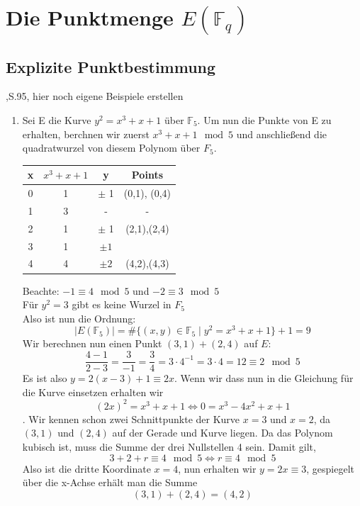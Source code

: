 \section{Die Punktmenge $E(\mathbb{F}_q)$}

\subsection{Explizite Punktbestimmung}
    \cite{washington08},S.95, hier noch eigene Beispiele erstellen
    \begin{enumerate}
        \item Sei E die Kurve $y^2=x^3+x+1$ über $\mathbb{F}_5$. Um nun die Punkte von E zu erhalten, berchnen wir zuerst $x^3+x+1\mod 5$ und anschließend die quadratwurzel von diesem Polynom über $F_5$.
        \begin{center}
            \begin{tabular}{c|c|c|c}
                 x & $x^3+x+1$ & y & Points \\
                 \hline
                 0 & 1 & $\pm$ 1 & (0,1), (0,4) \\
                 1 & 3 & - & - \\
                 2 & 1 & $\pm$ 1 &  (2,1),(2,4)\\
                 3 & 1 & $\pm 1$ & \\
                 4 & 4 & $\pm 2$ & (4,2),(4,3)  
            \end{tabular}
        \end{center}
    Beachte: $-1\equiv 4 \mod 5$ und $ -2\equiv 3 \mod 5$\\
    Für $y^2=3$ gibt es keine Wurzel in $F_5$\\

    Also ist nun die Ordnung: 
    \[
        \mid E(\mathbb{F}_5)\mid = \# \{(x,y)\in \mathbb{F}_5 \mid y^2=x^3+x+1\}+1 = 9
    \]
    Wir berechnen nun einen Punkt  $(3,1)+(2,4)$ auf $E$:
    \[
    \frac{4-1}{2-3}=\frac{3}{-1}=\frac{3}{4}=3\cdot4^{-1} =3\cdot 4=12  \equiv 2 \mod 5
    \]
    Es ist also $y=2(x-3)+1\equiv 2x$. Wenn wir dass nun in die Gleichung für die Kurve einsetzen erhalten wir
    \[(2x)^2=x^3+x+1\Leftrightarrow 0 = x^3-4x^2+x+1\]. Wir kennen schon zwei Schnittpunkte der Kurve $x=3$ und $x=2$, da $(3,1)$ und $(2,4)$ auf der Gerade und Kurve liegen. Da das Polynom kubisch ist, muss die Summe der drei Nullstellen 4 sein. Damit gilt, 
    \[
    3+2+r \equiv 4 \mod 5 \Leftrightarrow r\equiv 4 \mod 5
    \]
    Also ist die dritte Koordinate $x=4$, nun erhalten wir $y=2x\equiv 3$, gespiegelt über die x-Achse erhält man die Summe 
    \[(3,1)+(2,4)=(4,2)\]
    
    \end{enumerate}
    



